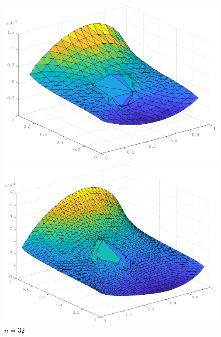 \documentclass[lang=cn,11pt,a4paper]{elegantpaper}
\begin{document}
\begin{figure}[htbp]
  \centering
  \begin{minipage}[t]{0.24\linewidth}
      \centering
      \includegraphics[width=0.95\linewidth]{figure/error_problem1_m_ir_n=16.eps}
      \caption*{$n=16$}
  \end{minipage}
  \begin{minipage}[t]{0.24\linewidth}
    \centering
    \includegraphics[width=0.95\linewidth]{figure/error_problem1_m_ir_n=32.eps}
    \caption*{$n=32$}
  \end{minipage}
  \begin{minipage}[t]{0.24\linewidth}
    \centering

\end{minipage}
\end{figure}
\end{document}
